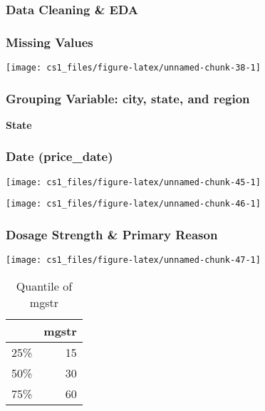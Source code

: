 \documentclass[
  11pt,
]{article}
\begin{document}
\hypertarget{data-cleaning-eda-1}{%
\subsubsection{Data Cleaning \& EDA}\label{data-cleaning-eda-1}}

\hypertarget{missing-values-1}{%
\subsubsection{Missing Values}\label{missing-values-1}}

\begin{center}\texttt{[image: cs1\_files/figure-latex/unnamed-chunk-38-1]} \end{center}

\hypertarget{grouping-variable-city-state-and-region-1}{%
\subsubsection{Grouping Variable: city, state, and
region}\label{grouping-variable-city-state-and-region-1}}

\textbf{State}

\hypertarget{date-price_date-1}{%
\subsubsection{Date (price\_date)}\label{date-price_date-1}}

\begin{center}\texttt{[image: cs1\_files/figure-latex/unnamed-chunk-45-1]} \end{center}

\begin{center}\texttt{[image: cs1\_files/figure-latex/unnamed-chunk-46-1]} \end{center}

\hypertarget{dosage-strength-primary-reason-1}{%
\subsubsection{Dosage Strength \& Primary
Reason}\label{dosage-strength-primary-reason-1}}

\begin{center}\texttt{[image: cs1\_files/figure-latex/unnamed-chunk-47-1]} \end{center}

\begin{table}

\caption{\label{tab:unnamed-chunk-49}Quantile of mgstr}
\centering
\begin{tabular}[t]{l|r}
\hline
  & mgstr\\
\hline
25\% & 15\\
\hline
50\% & 30\\
\hline
75\% & 60\\
\hline
\end{tabular}
\end{table}
\end{document}

